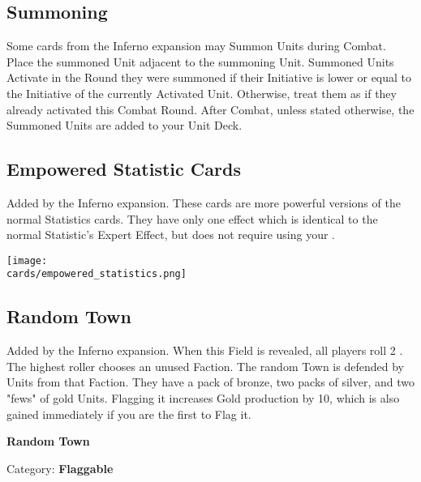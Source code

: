\begin{multicols*}{2}
\subsection*{Summoning}
Some cards from the Inferno expansion may Summon Units during Combat.
Place the summoned Unit adjacent to the summoning Unit.
Summoned Units Activate in the Round they were summoned if their Initiative is lower or equal to the Initiative of the currently Activated Unit.
Otherwise, treat them as if they already activated this Combat Round.
After Combat, unless stated otherwise, the Summoned Units are added to your Unit Deck.

\subsection*{Empowered Statistic Cards}
Added by the Inferno expansion.
These cards are more powerful versions of the normal Statistics cards.
They have only one effect which is identical to the normal Statistic's Expert Effect, but does not require using your .

\begin{center}
  \texttt{[image: \\cards/empowered\_statistics.png]}
\end{center}

\subsection*{Random Town}
Added by the Inferno expansion.
When this Field is revealed, all players roll 2 .
The highest roller chooses an unused Faction.
The random Town is defended by Units from that Faction.
They have a pack of bronze, two packs of silver, and two "fews" of gold Units.
Flagging it increases Gold production by 10, which is also gained immediately if you are the first to Flag it.

\bigskip

\begin{minipage}[h]{\linewidth}
  \begin{center}
    \textbf{Random Town}\medskip
  \end{center}
  \small{Category: \textbf{Flaggable}}
\end{minipage}

\end{multicols*}
